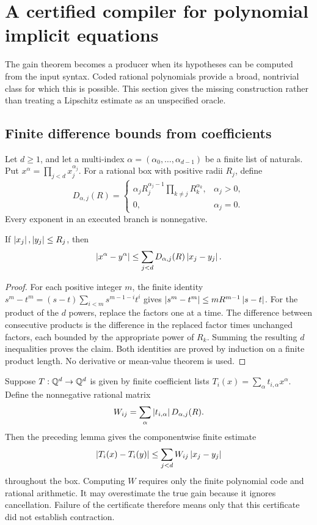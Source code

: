 \section{A certified compiler for polynomial implicit equations}\label{sec:polynomial}

The gain theorem becomes a producer when its hypotheses can be computed from the input syntax. Coded rational polynomials provide a broad, nontrivial class for which this is possible. This section gives the missing construction rather than treating a Lipschitz estimate as an unspecified oracle.

\subsection{Finite difference bounds from coefficients}

Let \(d\ge1\), and let a multi-index \(\alpha=(\alpha_0,\ldots,\alpha_{d-1})\) be a finite list of naturals. Put \(x^\alpha=\prod_{j<d}x_j^{\alpha_j}\). For a rational box with positive radii \(R_j\), define
\[
 D_{\alpha,j}(R)=
 \begin{cases}
 \alpha_j R_j^{\alpha_j-1}\displaystyle\prod_{k\ne j}R_k^{\alpha_k},&\alpha_j>0,\\
 0,&\alpha_j=0.
 \end{cases}
\]
Every exponent in an executed branch is nonnegative.

\begin{lemma}\label{lem:monomial}
If \(\left|x_j\right|,\left|y_j\right|\le R_j\), then
\[
 \left|x^\alpha-y^\alpha\right|
 \le\sum_{j<d}D_{\alpha,j}(R)\left|x_j-y_j\right|.
\]
\end{lemma}
\begin{proof}
For each positive integer \(m\), the finite identity
\(s^m-t^m=(s-t)\sum_{i<m}s^{m-1-i}t^i\)
gives \(\left|s^m-t^m\right|\le mR^{m-1}\left|s-t\right|\). For the product of the \(d\) powers, replace the factors one at a time. The difference between consecutive products is the difference in the replaced factor times unchanged factors, each bounded by the appropriate power of \(R_k\). Summing the resulting \(d\) inequalities proves the claim. Both identities are proved by induction on a finite product length. No derivative or mean-value theorem is used.
\end{proof}

Suppose \(T:\mathbb Q^d\to\mathbb Q^d\) is given by finite coefficient lists
\(T_i(x)=\sum_\alpha t_{i,\alpha}x^\alpha\). Define the nonnegative rational matrix
\begin{equation}\label{eq:polygain}
 W_{ij}=\sum_\alpha\left|t_{i,\alpha}\right|D_{\alpha,j}(R).
\end{equation}
Then the preceding lemma gives the componentwise finite estimate
\begin{equation}\label{eq:polylip}
 \left|T_i(x)-T_i(y)\right|\le\sum_{j<d}W_{ij}\left|x_j-y_j\right|
\end{equation}
throughout the box. Computing \(W\) requires only the finite polynomial code and rational arithmetic. It may overestimate the true gain because it ignores cancellation. Failure of the certificate therefore means only that this certificate did not establish contraction.

